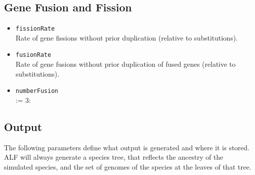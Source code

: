 \documentclass[11pt]{article}
\begin{document}
\subsection{Gene Fusion and Fission}
\begin{itemize}
\item{\texttt{fissionRate}} \hfill \\
Rate of gene fissions without prior duplication (relative to substitutions).
\item{\texttt{fusionRate}} \hfill \\
Rate of gene fusions without prior duplication of fused genes (relative to substitutions).
\item{\texttt{numberFusion}} \hfill \\
 := 3:
\end{itemize}

\subsection{Output}
The following parameters define what output is generated and where it is stored. ALF will always generate a species tree, that reflects the ancestry of the simulated species, and the set of genomes of the species at the leaves of that tree.
\end{document}
